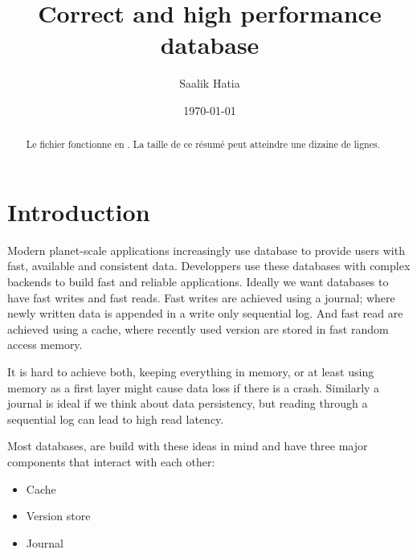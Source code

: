 \documentclass[systeme]{compas2022}
\begin{document}
\title{Correct and high performance database}

\author{Saalik Hatia}%

\address{Université Pierre et Marie Curie\\
Laboratoire LIP6 \\
4, place jussieu\\
75005 Paris - France\\
saalik.hatia@lip6.fr}

\date{\today}

\maketitle

\begin{abstract}
  Le fichier fonctionne en \LaTeXe. La taille
  de ce résumé peut atteindre une dizaine de lignes.
\end{abstract}


\section{Introduction}


Modern planet-scale applications increasingly use database to provide users with fast, available and consistent data.
Developpers use these databases with complex backends to build fast and reliable applications.
Ideally we want databases to have fast writes and fast reads.
Fast writes are achieved using a journal; where newly written data is appended in a write only sequential log.
And fast read are achieved using a cache, where recently used version are stored in fast random access memory.

It is hard to achieve both, keeping everything in memory, or at least using memory as a first layer might cause data loss if there is a crash.
Similarly a journal is ideal if we think about data persistency, but reading through a sequential log can lead to high read latency.

Most databases, are build with these ideas in mind and have three major components that interact with each other:
\begin{itemize}
  \item Cache
  \item Version store
  \item Journal
\end{itemize}
\end{document}
